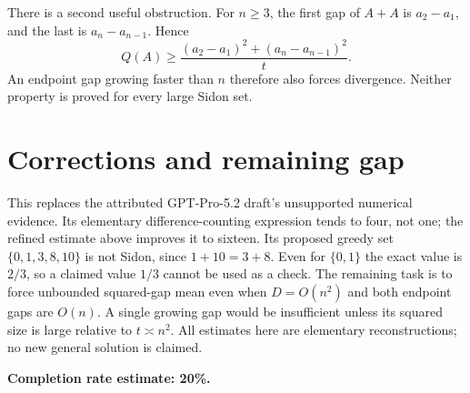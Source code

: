 \documentclass[11pt]{article}
\begin{document}
There is a second useful obstruction. For $n\ge3$, the first gap of $A+A$ is $a_2-a_1$, and the last is $a_n-a_{n-1}$. Hence
\[
 Q(A)\ge\frac{(a_2-a_1)^2+(a_n-a_{n-1})^2}{t}.
\]
An endpoint gap growing faster than $n$ therefore also forces divergence. Neither property is proved for every large Sidon set.

\section*{Corrections and remaining gap}
This replaces the attributed GPT-Pro-5.2 draft's unsupported numerical evidence. Its elementary difference-counting expression tends to four, not one; the refined estimate above improves it to sixteen. Its proposed greedy set $\{0,1,3,8,10\}$ is not Sidon, since $1+10=3+8$. Even for $\{0,1\}$ the exact value is $2/3$, so a claimed value $1/3$ cannot be used as a check.
The remaining task is to force unbounded squared-gap mean even when $D=O(n^2)$ and both endpoint gaps are $O(n)$. A single growing gap would be insufficient unless its squared size is large relative to $t\asymp n^2$. All estimates here are elementary reconstructions; no new general solution is claimed.

\textbf{Completion rate estimate: 20\%.}
\end{document}

